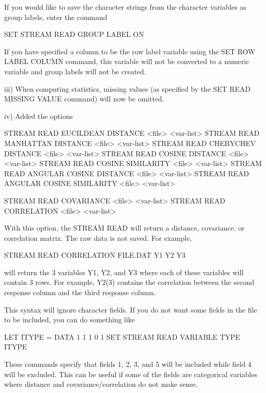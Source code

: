             If you would like to save the character strings from the
            character variables as group labels, enter the command

                SET STREAM READ GROUP LABEL ON

            If you have specified a column to be the row label variable
            using the SET ROW LABEL COLUMN command, this variable will
            not be converted to a numeric variable and group labels will
            not be created.

       iii) When computing statistics, missing values (as specified by the
            SET READ MISSING VALUE command) will now be omitted.

        iv) Added the options

                STREAM READ EUCILDEAN DISTANCE <file> <var-list>
                STREAM READ MANHATTAN DISTANCE <file> <var-list>
                STREAM READ CHEBYCHEV DISTANCE <file> <var-list>
                STREAM READ COSINE DISTANCE <file> <var-list>
                STREAM READ COSINE SIMILARITY <file> <var-list>
                STREAM READ ANGULAR COSINE DISTANCE <file> <var-list>
                STREAM READ ANGULAR COSINE SIMILARITY <file> <var-list>

                STREAM READ COVARIANCE  <file> <var-list>
                STREAM READ CORRELATION <file> <var-list>

             With this option, the STREAM READ will return a distance,
             covariance, or correlation matrix.  The raw data is not
             saved.  For example,

                 STREAM READ CORRELATION FILE.DAT Y1 Y2 Y3

             will return the 3 variables Y1, Y2, and Y3 where each of
             these variables will contain 3 rows.  For example, Y2(3)
             contains the correlation between the second response column
             and the third response column.

             This syntax will ignore character fields.  If you do not
             want some fields in the file to be included, you can do
             something like

                 LET ITYPE = DATA 1 1 1 0 1
                 SET STREAM READ VARIABLE TYPE ITYPE

             These commands specify that fields 1, 2, 3, and 5 will be
             included while field 4 will be excluded.  This can be useful
             if some of the fields are categorical variables where
             distance and covariance/correlation do not make sense.
 
